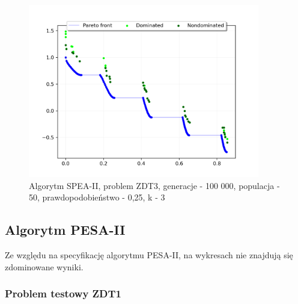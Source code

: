 \documentclass{classrep}
\begin{document}
\begin{figure}[H]
    \centering
    \includegraphics[width=0.9\textwidth]{img2/SPEAII_ZDT3_g10000_p50_r0,25_e3.png}
    \caption{Algorytm SPEA-II, problem ZDT3, \newline generacje - 100 000, populacja - 50, prawdopodobieństwo - 0,25, k - 3}
\end{figure}

\subsection{Algorytm PESA-II}

Ze względu na specyfikację algorytmu PESA-II, na wykresach nie znajdują się zdominowane wyniki.

\subsubsection{Problem testowy ZDT1}
\end{document}
